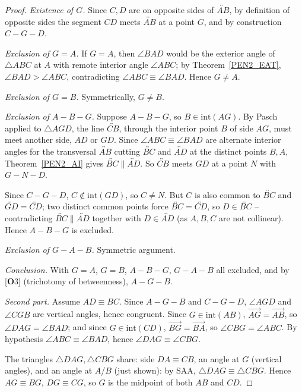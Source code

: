 \documentclass[11pt,a4paper]{article}
\theoremstyle{definition}
\theoremstyle{remark}
\numberwithin{equation}{section}
\begin{document}
\begin{proof}
\emph{Existence of $G$.} Since $C,D$ are on opposite sides of $\overleftrightarrow{AB}$, by
definition of opposite sides \cite[Definition p. 77]{Greenberg1993} the segment $CD$ meets
$\overleftrightarrow{AB}$ at a point $G$, and by construction $C-G-D$.

\emph{Exclusion of $G=A$.} If $G=A$, then $\angle BAD$ would be the exterior angle of
$\triangle ABC$ at $A$ with remote interior angle $\angle ABC$; by Theorem~\ref{PEN2_EAT},
$\angle BAD>\angle ABC$, contradicting $\angle ABC\equiv\angle BAD$. Hence $G\neq A$.

\emph{Exclusion of $G=B$.} Symmetrically, $G\neq B$.

\emph{Exclusion of $A-B-G$.} Suppose $A-B-G$, so $B\in\mathrm{int}(AG)$. By Pasch applied to
$\triangle AGD$, the line $\overleftrightarrow{CB}$, through the interior point $B$ of side
$AG$, must meet another side, $AD$ or $GD$. Since $\angle ABC\equiv\angle BAD$ are alternate
interior angles for the transversal $\overleftrightarrow{AB}$ cutting
$\overleftrightarrow{BC}$ and $\overleftrightarrow{AD}$ at the distinct points $B,A$,
Theorem~\ref{PEN2_AI} gives $\overleftrightarrow{BC}\parallel\overleftrightarrow{AD}$. So
$\overleftrightarrow{CB}$ meets $GD$ at a point $N$ with $G-N-D$.

Since $C-G-D$, $C\notin\mathrm{int}(GD)$, so $C\neq N$. But $C$ is also common to
$\overleftrightarrow{BC}$ and $\overleftrightarrow{GD}=\overleftrightarrow{CD}$; two distinct
common points force $\overleftrightarrow{BC}=\overleftrightarrow{CD}$, so
$D\in\overleftrightarrow{BC}$ -- contradicting $\overleftrightarrow{BC}\parallel
\overleftrightarrow{AD}$ together with $D\in\overleftrightarrow{AD}$ (as $A,B,C$ are not
collinear). Hence $A-B-G$ is excluded.

\emph{Exclusion of $G-A-B$.} Symmetric argument.

\emph{Conclusion.} With $G=A$, $G=B$, $A-B-G$, $G-A-B$ all excluded, and by [\textbf{O}3]
(trichotomy of betweenness), $A-G-B$.

\emph{Second part.} Assume $AD\equiv BC$. Since $A-G-B$ and $C-G-D$, $\angle AGD$ and
$\angle CGB$ are vertical angles, hence congruent. Since $G\in\mathrm{int}(AB)$,
$\overrightarrow{AG}=\overrightarrow{AB}$, so $\angle DAG=\angle BAD$; and since
$G\in\mathrm{int}(CD)$, $\overrightarrow{BG}=\overrightarrow{BA}$, so $\angle CBG=\angle ABC$.
By hypothesis $\angle ABC\equiv\angle BAD$, hence $\angle DAG\equiv\angle CBG$.

The triangles $\triangle DAG,\triangle CBG$ share: side $DA\equiv CB$, an angle at $G$
(vertical angles), and an angle at $A$/$B$ (just shown): by SAA,
$\triangle DAG\equiv\triangle CBG$. Hence $AG\equiv BG$, $DG\equiv CG$, so $G$ is the
midpoint of both $AB$ and $CD$.
\end{proof}
\end{document}
